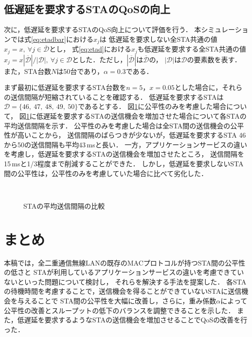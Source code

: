 \documentclass[technicalreport]{ieicej}
\begin{document}
	\subsection{低遅延を要求するSTAのQoSの向上}
	次に，低遅延を要求するSTAのQoS向上について評価を行う．
	本シミュレーションでは式\eqref{eq:etadbar}における$x_j$は
	低遅延を要求しない全STA共通の値$x_j=x,\ \forall j\in {\overline {\mathcal D}}$とし，
	式\eqref{eq:etad}における$x_j$も低遅延を要求する全STA共通の値$x_j=x|{\overline {\mathcal D}}|/|{\mathcal D}|,\ \forall j \in {\mathcal D}$とした．ただし，$|{\overline {\mathcal D}}|$は${\overline {\mathcal D}}$の，
	$|{\mathcal D}|$は${\mathcal D}$の要素数を表す．
	また，STA台数$N$は50台であり，$\alpha=0.3$である．
	\par
	まず最初に低遅延を要求するSTA台数を$n=5$，$x=0.05$とした場合に，それらの送信間隔が短縮されていることを確認する．
	低遅延を要求するSTAは${\mathcal D}=\{46,\ 47,\ 48,\ 49,\ 50\}$であるとする．
	図\ref{fig:inter}に公平性のみを考慮した場合について，
	図\ref{fig:inter}に低遅延を要求するSTAの送信機会を増加させた場合について各STAの平均送信間隔を示す．
	公平性のみを考慮した場合は全STA間の送信機会の公平性が高いことから，
	送信間隔のばらつきが少ないが，低遅延を要求するSTA 46から50の送信間隔も平均43\,msと長い．
	一方，アプリケーションサービスの違いを考慮し，低遅延を要求するSTAの送信機会を増加させたところ，
	送信間隔を15\,msと1/3程度まで削減することができた．
	しかし，低遅延を要求しないSTA間の公平性は，公平性のみを考慮していた場合に比べて劣化した．

	\begin{figure}[t]
		\centering
		\\
		\caption{STAの平均送信間隔の比較}
		\label{fig:inter}
	\end{figure}

\section{まとめ}
本稿では，全二重通信無線LANの既存のMACプロトコルが持つSTA間の公平性の低さと
STAが利用しているアプリケーションサービスの違いを考慮できていないといった問題について検討し，
それらを解決する手法を提案した．
各STAの待機時間を考慮することで，送信機会を得ることができていないSTAに送信機会を与えることで
STA間の公平性を大幅に改善し，さらに，重み係数$\alpha$によって公平性の改善とスループットの低下のバランスを調整できることを示した．
また，低遅延を要求するようなSTAの送信機会を増加させることでQoSの改善を行った．





\end{document}
